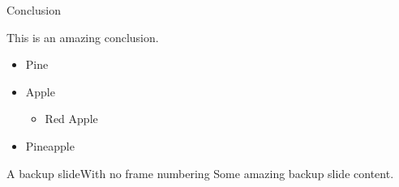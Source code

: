 \documentclass[t,10pt,xcolor={dvipsnames}]{beamer}
\begin{document}

\begin{frame}{Conclusion}
	\vspace{20pt}
	\begin{center}
		This is an amazing conclusion.
		\vspace{10pt}
		\begin{itemize}
			\setlength\itemsep{10pt}
			\item<2-> Pine
			\item<3-> Apple
				\begin{itemize}
					\item<5-> Red Apple
				\end{itemize}
			\item<4-> Pineapple
		\end{itemize}
	\end{center}
\end{frame}


\begin{frame}[noframenumbering]{A backup slide}{With no frame numbering}
	\centering
	\vspace{20pt}
	Some amazing backup slide content.
\end{frame}
\end{document}
